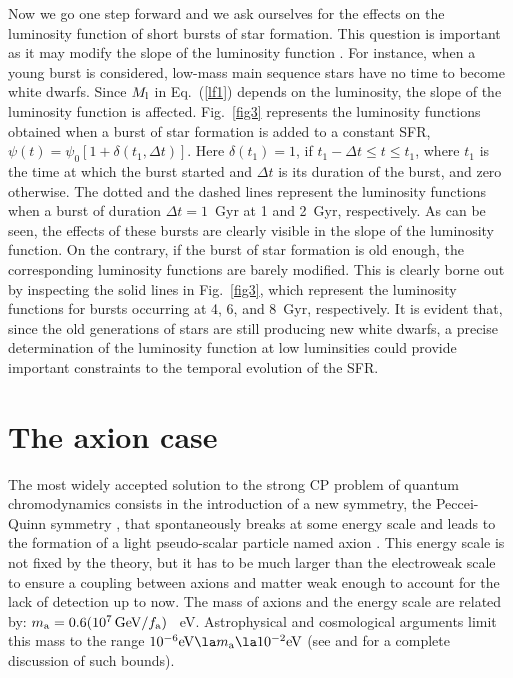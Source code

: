 \documentclass[useAMS,usenatbib]{mnras}
\begin{document}
Now we go one step forward and we ask ourselves for the effects on the
luminosity function of short bursts  of star formation.  This question
is  important   as  it  may   modify  the  slope  of   the  luminosity
function \citep{noh90}. For  instance, when  a young  burst is  considered, low-mass
main sequence stars have no time to become white dwarfs. Since $M_{\rm
l}$ in  Eq.~(\ref{lf1}) depends  on the luminosity,  the slope  of the
luminosity  function  is  affected.   Fig.~\ref{fig3}  represents  the
luminosity functions obtained when a  burst of star formation is added
to a  constant SFR,  $\psi(t)=\psi_0 [1+\delta(t_1,\Delta  t)]$.  Here
$\delta(t_1)=1$, if $t_1 - \Delta t \le t \le t_1$, where $t_1$ is the
time at which the burst started and  $\Delta t$ is its duration of the
burst, and zero  otherwise. The dotted and the  dashed lines represent
the luminosity functions when a burst of duration $\Delta t =1$~Gyr at
1 and 2~Gyr, respectively. As can  be seen, the effects of these bursts
are clearly visible in the slope of the luminosity function. On the
contrary, if the burst  of  star formation  is old enough, the
corresponding luminosity  functions  are barely  modified. This is
clearly borne out by inspecting  the solid lines  in Fig.~\ref{fig3},
which represent the luminosity functions for bursts occurring at 4, 6,
and 8~Gyr, respectively. It is evident that, since the old 
generations of stars are still producing new white dwarfs, a precise 
determination of the luminosity function at low luminsities could 
provide important constraints to the temporal evolution of the SFR.

\section{The axion case}
The most widely accepted solution to  the strong CP problem of quantum
chromodynamics consists  in the  introduction of  a new  symmetry, the
Peccei-Quinn  symmetry   \citep{pecc77a,pecc77b},  that  spontaneously
breaks at  some energy scale  and leads to  the formation of  a light
pseudo-scalar particle named axion \citep{wein78,wilc78}.  This energy
scale is not  fixed by the theory,  but it has to be  much larger than
the electroweak scale  to ensure a coupling between  axions and matter
weak enough to account  for the lack of detection up  to now. The mass
of axions and the energy scale are related by: $m_{\rm a} = 0.6(10^7\,
{\rm GeV}/f_{\rm  a})$~ eV.  Astrophysical and  cosmological arguments
limit  this mass  to the  range $10^{-6}  {\rm eV}  \la m_{\rm  a} \la
10^{-2}{\rm eV}$ (see \citet{turn90} and \citet{raff96} for a complete 
discussion of such bounds).
\end{document}
